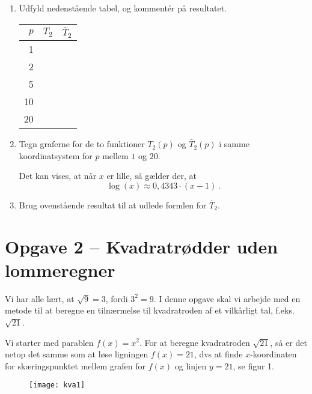 \documentclass[12pt,oneside,a4paper]{article}
\theoremstyle{plain}
\begin{document}
\begin{enumerate}[label=(\alph*), resume]
    \item Udfyld nedenstående tabel, og kommentér på resultatet.
        \begin{center}
            \begin{tabular}{|r|c|l|}
\hline
                $p$ & $T_2$ & $\bar T_2$ \\
                \hline
                1 & & \\
                \hline
                2 & & \\
                \hline
                5 & & \\
                \hline
                10 & & \\
                \hline
                20 & & \\
                \hline
            \end{tabular}
        \end{center}

    \item Tegn graferne for de to funktioner $T_2(p)$ og $\bar T_2(p)$ i samme
        koordinatsystem for $p$ mellem $1$ og $20$.

Det kan vises, at når $x$ er lille, så gælder der, at
        \[
            \log(x) \approx 0,4343 \cdot (x-1) \,.
        \]

    \item Brug ovenstående resultat til at udlede formlen for $\bar T_2$.

\end{enumerate}


\section*{Opgave 2 -- Kvadratrødder uden lommeregner}
Vi har alle lært, at $\sqrt{9} = 3$, fordi $3^2 = 9$. I denne opgave skal vi
arbejde med en metode til at beregne en tilnærmelse til kvadratroden af et
vilkårligt tal, f.eks.
$\sqrt{21}$.

Vi starter med parablen $f(x) = x^2$. For at beregne kvadratroden $\sqrt{21}$,
så er det netop det samme som at løse ligningen $f(x) = 21$, dvs at finde
$x$-koordinaten for skæringspunktet mellem grafen for $f(x)$ og linjen $y=21$,
se figur 1.

\begin{figure}[ht]
    \centering
    \texttt{[image: kva1]}
    \caption{}
    \label{fig1}
\end{figure}
\end{document}
